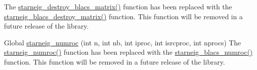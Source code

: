 \begin{DoxyRefList}
%
The \mbox{\hyperlink{group__starneig__dm__blacs_ga0903294d74d8f910582e6d7110cbf2b3}{starneig\+\_\+destroy\+\_\+blacs\+\_\+matrix()}} function has been replaced with the \mbox{\hyperlink{group__starneig__dm__blacs_ga4e196ffbc2c502f83d3c6f722cd6a699}{starneig\+\_\+blacs\+\_\+destroy\+\_\+matrix()}} function. This function will be removed in a future release of the library.  
\item[Global \mbox{\hyperlink{group__starneig__dm__blacs__helpers_ga3f94149d3afe378aa05bbabaf6109b76}{starneig\+\_\+numroc}} (int n, int nb, int iproc, int isrcproc, int nprocs)]\label{deprecated__deprecated000004}%
%
The \mbox{\hyperlink{group__starneig__dm__blacs__helpers_ga3f94149d3afe378aa05bbabaf6109b76}{starneig\+\_\+numroc()}} function has been replaced with the \mbox{\hyperlink{group__starneig__dm__blacs__helpers_ga54243432361d199ce2aaa84b892d3036}{starneig\+\_\+blacs\+\_\+numroc()}} function. This function will be removed in a future release of the library. 
\end{DoxyRefList}